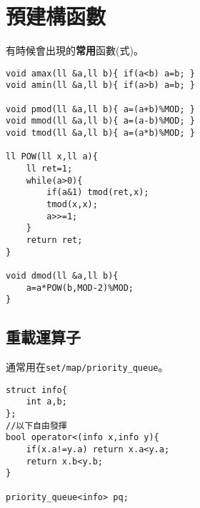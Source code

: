 \section{預建構函數}
    有時候會出現的\textbf{常用}函數(式)。

    \begin{lstlisting}[caption=可能會用的函數]
void amax(ll &a,ll b){ if(a<b) a=b; }
void amin(ll &a,ll b){ if(a>b) a=b; }

void pmod(ll &a,ll b){ a=(a+b)%MOD; }
void mmod(ll &a,ll b){ a=(a-b)%MOD; }
void tmod(ll &a,ll b){ a=(a*b)%MOD; }

ll POW(ll x,ll a){
    ll ret=1;
    while(a>0){
        if(a&1) tmod(ret,x);
        tmod(x,x);
        a>>=1;
    }
    return ret;
}

void dmod(ll &a,ll b){
    a=a*POW(b,MOD-2)%MOD;
}\end{lstlisting}

    \subsection{重載運算子}
    通常用在\verb|set/map/priority_queue|。
    \begin{lstlisting}[caption=運算子重載]
struct info{
    int a,b;
};
//以下自由發揮
bool operator<(info x,info y){
    if(x.a!=y.a) return x.a<y.a;
    return x.b<y.b;
}

priority_queue<info> pq;\end{lstlisting}
    